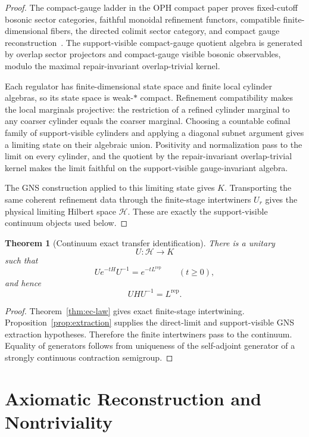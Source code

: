 \documentclass[11pt]{article}
\numberwithin{equation}{section}
\newtheorem{theorem}{Theorem}[section]
\theoremstyle{remark}
\newcommand{\Hcal}{\mathcal H}
\begin{document}
\begin{proof}
The compact-gauge ladder in the OPH compact paper proves fixed-cutoff bosonic sector categories,
faithful monoidal refinement functors, compatible finite-dimensional fibers, the directed colimit
sector category, and compact gauge reconstruction~\cite{oph2}. The support-visible compact-gauge
quotient algebra is generated by overlap sector projectors and compact-gauge visible bosonic
observables, modulo the maximal repair-invariant overlap-trivial kernel.

Each regulator has finite-dimensional state space and finite local cylinder algebras, so its state
space is weak-\(*\) compact. Refinement compatibility makes the local marginals projective: the
restriction of a refined cylinder marginal to any coarser cylinder equals the coarser marginal.
Choosing a countable cofinal family of support-visible cylinders and applying a diagonal subnet
argument gives a limiting state on their algebraic union. Positivity and normalization pass to the
limit on every cylinder, and the quotient by the repair-invariant overlap-trivial kernel makes the
limit faithful on the support-visible gauge-invariant algebra.

The GNS construction applied to this limiting state gives \(K\). Transporting the same coherent
refinement data through the finite-stage intertwiners \(U_r\) gives the physical limiting Hilbert
space \(\Hcal\). These are exactly the support-visible continuum objects used below.
\end{proof}

\begin{theorem}[Continuum exact transfer identification]
\label{thm:continuum}
There is a unitary
\[
U:\Hcal\to K
\]
such that
\[
U e^{-tH}U^{-1}=e^{-tL^{\mathrm{rep}}}
\qquad(t\ge0),
\tag{8}
\]
and hence
\[
UHU^{-1}=L^{\mathrm{rep}}.
\tag{9}
\]
\end{theorem}

\begin{proof}
Theorem~\ref{thm:ec-law} gives exact finite-stage intertwining. Proposition~\ref{prop:extraction}
supplies the direct-limit and support-visible GNS extraction hypotheses. Therefore the finite
intertwiners pass to the continuum. Equality of generators follows from uniqueness of the
self-adjoint generator of a strongly continuous contraction semigroup.
\end{proof}

\section{Axiomatic Reconstruction and Nontriviality}
\end{document}
